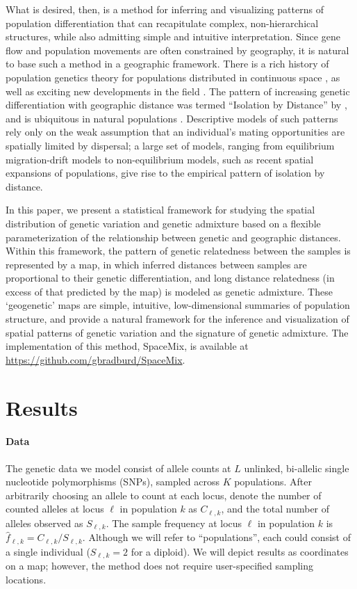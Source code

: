 \documentclass[12pt]{article}
\begin{document}
What is desired, then, is a method for inferring and visualizing patterns of population differentiation that can recapitulate complex, non-hierarchical structures, while also admitting simple and intuitive interpretation.  
Since gene flow and population movements are often constrained by geography,
it is natural to base such a method in a geographic framework.
There is a rich history of population genetics theory for populations distributed in continuous space \citep{Malecot1975, nagylaki1978diffusion, felsensten1975pain, barton-depaulis-etheridge}, as well as exciting new developments in the field \citep[e.g.][]{Petkova_2014_EEMS}.
The pattern of increasing genetic differentiation with geographic distance 
was termed ``Isolation by Distance'' by \citet{Wright1943},
and is ubiquitous in natural populations \citep{meirmans2012}.
Descriptive models of such patterns rely only on the weak assumption that an individual's mating opportunities are spatially limited by dispersal; 
a large set of models, ranging from equilibrium migration-drift models to non-equilibrium models, such as recent spatial expansions of populations, 
give rise to the empirical pattern of isolation by distance.

In this paper, we present a statistical framework for studying the spatial distribution of genetic variation and genetic admixture based on a flexible parameterization
of the relationship between genetic and geographic distances.
Within this framework, the pattern of genetic relatedness between the samples is represented by a map, 
in which inferred distances between samples are proportional to their genetic differentiation, 
and long distance relatedness (in excess of that predicted by the map) is modeled as genetic admixture.
These `geogenetic'  maps are simple, intuitive, low-dimensional summaries of population structure, 
and provide a natural framework for the inference and visualization of spatial patterns of genetic variation and the signature of genetic admixture.  
The implementation of this method, SpaceMix, is available at \href{https://github.com/gbradburd/SpaceMix}{https://github.com/gbradburd/SpaceMix}.


\section*{Results}

\paragraph{Data}
The genetic data we model consist of allele counts
at $L$ unlinked, bi-allelic single nucleotide polymorphisms (SNPs), sampled across $K$ populations.
After arbitrarily choosing an allele to count at each locus, 
denote the number of counted alleles at locus $\ell$ in population $k$ as $C_{\ell,k}$,
and the total number of alleles observed as $S_{\ell,k}$.
The sample frequency at locus $\ell$ in population $k$ is $\hat{f}_{\ell,k} = C_{\ell,k}/S_{\ell,k}$.  
Although we will refer to ``populations'', each could consist of a single individual ($S_{\ell,k}=2$ for a diploid).
We will depict results as coordinates on a map; however, the method does not require user-specified sampling locations.
\end{document}
